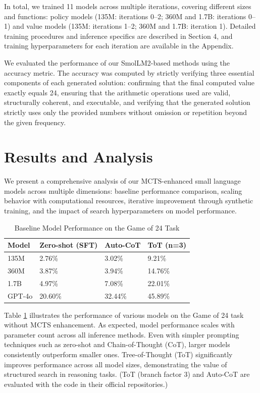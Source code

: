 \documentclass{article}
\begin{document}
In total, we trained 11 models across multiple iterations, covering different sizes and functions: policy models (135M: iterations 0–2; 360M and 1.7B: iterations 0–1) and value models (135M: iterations 1–2; 360M and 1.7B: iteration 1). Detailed training procedures and inference specifics are described in Section 4, and training hyperparameters for each iteration are available in the Appendix.

We evaluated the performance of our SmolLM2-based methods using the accuracy metric. The accuracy was computed by strictly verifying three essential components of each generated solution: confirming that the final computed value exactly equals 24, ensuring that the arithmetic operations used are valid, structurally coherent, and executable, and verifying that the generated solution strictly uses only the provided numbers without omission or repetition beyond the given frequency.

\section{Results and Analysis}

We present a comprehensive analysis of our MCTS-enhanced small language models across multiple dimensions: baseline performance comparison, scaling behavior with computational resources, iterative improvement through synthetic training, and the impact of search hyperparameters on model performance.

\begin{table}[h]
    \centering
    \caption{Baseline Model Performance on the Game of 24 Task}
    \label{tab:baselines}
    \begin{tabular}{p{2cm}p{3cm}p{3cm}p{3cm}}
        \toprule
        \textbf{Model} & \textbf{Zero-shot (SFT)} & \textbf{Auto-CoT \cite{zhang2022automaticchainthoughtprompting}} & \textbf{ToT \cite{yao2023tree} (n=3)} \\
        \midrule
        135M   & 2.76\%  & 3.02\%  & 9.21\% \\
        360M   & 3.87\%  & 3.94\%  & 14.76\% \\
        1.7B   & 4.97\%  & 7.08\%  & 22.01\% \\
        GPT-4o & 20.60\% & 32.44\% & 45.89\% \\
        \bottomrule
    \end{tabular}
\end{table}

Table \ref{tab:baselines} illustrates the performance of various models on the Game of 24 task without MCTS enhancement. As expected, model performance scales with parameter count across all inference methods. Even with simpler prompting techniques such as zero-shot and Chain-of-Thought (CoT), larger models consistently outperform smaller ones. Tree-of-Thought (ToT) significantly improves performance across all model sizes, demonstrating the value of structured search in reasoning tasks. (ToT (branch factor 3) \cite{yao2023tree} and Auto-CoT \cite{zhang2022automaticchainthoughtprompting} are evaluated with the code in their official repositories.)
\end{document}
